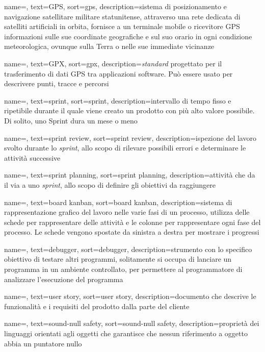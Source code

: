 {
    name=,
    text=GPS,
    sort=gps,
    description={sistema di posizionamento e navigazione satellitare militare statunitense, attraverso una rete dedicata di satelliti artificiali in orbita, fornisce a un terminale mobile o ricevitore GPS informazioni sulle sue coordinate geografiche e sul suo orario in ogni condizione meteorologica, ovunque sulla Terra o nelle sue immediate vicinanze }
}

{
    name=,
    text=GPX,
    sort=gpx,
    description={\textit{standard} progettato per il trasferimento di dati GPS tra applicazioni software. Può essere usato per descrivere punti, tracce e percorsi}
}


{
    name=,
    text=sprint,
    sort=sprint,
    description={intervallo di tempo fisso e ripetibile durante il quale viene creato un prodotto con più alto valore possibile. Di solito, uno Sprint dura un mese o meno}
}

{
    name=,
    text=sprint review,
    sort=sprint review,
    description={ispezione del lavoro svolto durante lo \textit{sprint}, allo scopo di rilevare possibili errori e determinare le attività successive}
}

{
    name=,
    text=sprint planning,
    sort=sprint planning,
    description={attività che da il via a uno \textit{sprint}, allo scopo di definire gli obiettivi da raggiungere}
}


{
    name=,
    text=board kanban,
    sort=board kanban,
    description={sistema di rappresentazione grafico del lavoro nelle varie fasi di un processo, utilizza delle schede per rappresentare delle attività e le colonne per rappresentare ogni fase del processo. Le schede vengono spostate da sinistra a destra per mostrare i progressi}
}

{
    name=,
    text=debugger,
    sort=debugger,
    description={strumento con lo specifico obiettivo di testare altri programmi, solitamente si occupa di lanciare un programma in un ambiente controllato, per permettere al programmatore di analizzare l'esecuzione del programma}
}

{
    name=,
    text=user story,
    sort=user story,
    description={documento che descrive le funzionalità e i requisiti del prodotto dalla parte del cliente}
}

{
    name=,
    text=sound-null safety,
    sort=sound-null safety,
    description={proprietà dei linguaggi orientati agli oggetti che garantisce che nessun riferimento a oggetto abbia un puntatore nullo}
}
